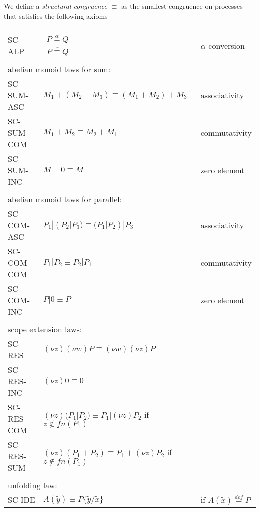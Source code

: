 \begin{definition}
  We define a \emph{structural congruence $\equiv$} as the smallest congruence on processes that satisfies the following axioms 
  \begin{center}
    \begin{tabular}{lll}
      \hline\\
	SC-ALP&$\begin{array}{c}P \stackrel{\alpha}{=} Q\\\overline{P\equiv Q}\end{array}$&$\alpha$ conversion
      \\\\
	\multicolumn{3}{l}{abelian monoid laws for sum:}
      \\
	SC-SUM-ASC& $M_{1}+(M_{2}+M_{3})\equiv (M_{1}+M_{2})+M_{3}$ &associativity
      \\
	SC-SUM-COM& $M_{1}+M_{2}\equiv M_{2}+M_{1}$ &commutativity
      \\
	SC-SUM-INC& $M+0\equiv M$&zero element
      \\\\
	\multicolumn{3}{l}{abelian monoid laws for parallel:}
      \\
	SC-COM-ASC& $P_{1}|(P_{2}|P_{3})\equiv (P_{1}|P_{2})|P_{3}$ &associativity
      \\
	SC-COM-COM& $P_{1}|P_{2}\equiv P_{2}|P_{1}$ &commutativity
      \\
	SC-COM-INC& $P|0\equiv P$&zero element
      \\\\
	\multicolumn{3}{l}{scope extension laws:}
      \\
	SC-RES& $(\nu z) (\nu w) P \equiv (\nu w) (\nu z) P$ &
      \\
	SC-RES-INC& $(\nu z) 0 \equiv 0$ &
      \\
	SC-RES-COM& $(\nu z) (P_{1}|P_{2}) \equiv P_{1}|(\nu z) P_{2}$ if $z\notin fn(P_{1})$&
      \\
	SC-RES-SUM& $(\nu z) (P_{1}+P_{2}) \equiv P_{1}+(\nu z) P_{2}$ if $z\notin fn(P_{1})$&
      \\\\
	\multicolumn{3}{l}{unfolding law:}
      \\
	SC-IDE&$A(\tilde{y})\equiv P\{\tilde{y}/\tilde{x}\}$&if $A(\tilde{x})\stackrel{def}{=}P$
      \\\hline
    \end{tabular}
  \end{center}
\end{definition}

